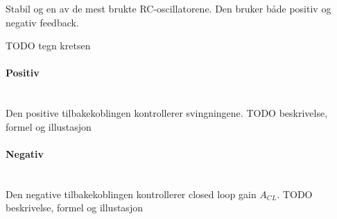 Stabil og en av de mest brukte RC-oscillatorene.
Den bruker både positiv og negativ feedback.

TODO tegn kretsen



\paragraph{Positiv} \mbox{} \\
Den positive tilbakekoblingen kontrollerer svingningene.
TODO beskrivelse, formel og illustasjon



\paragraph{Negativ} \mbox{} \\
Den negative tilbakekoblingen kontrollerer closed loop gain $A_{CL}$.
TODO beskrivelse, formel og illustasjon
